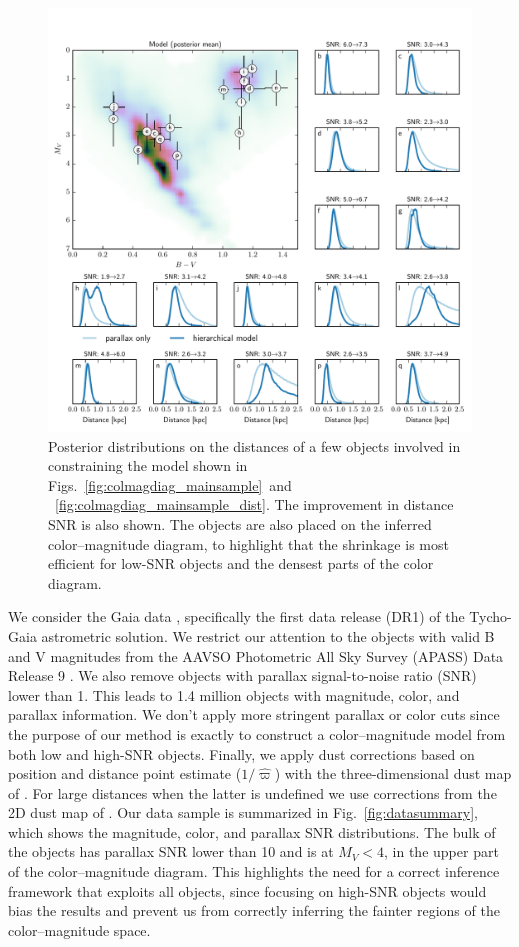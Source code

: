 \documentclass[manuscript, letterpaper]{aastex6}
\newcommand{\figref}[1]{{\xspace}Fig.~\ref{#1}}
\newcommand{\figrefs}[2]{{\xspace}Figs.~\ref{#1}~and ~\ref{#2}}
\begin{document}
\begin{figure}
\hspace*{-2mm}\includegraphics[width=15.7cm]{model_dist_pdfs.pdf}
\caption{Posterior distributions on the distances of a few objects involved in constraining the model shown in \figrefs{fig:colmagdiag_mainsample}{fig:colmagdiag_mainsample_dist}. 
The improvement in distance SNR is also shown. The objects are also placed on the inferred color--magnitude diagram, to highlight that the shrinkage is most efficient for low-SNR objects and the densest parts of the color diagram.}
\end{figure}

We consider the Gaia data \citep{gaia}, specifically the first data release (DR1) of the Tycho-Gaia astrometric solution\citep[hereafter TGAS][]{gaia_dr1}.
We restrict our attention to the objects with valid B and V magnitudes from the AAVSO Photometric All Sky Survey (APASS) Data Release 9 \citep{munari2014, hendenmunari2014}. 
We also remove objects with parallax signal-to-noise ratio (SNR) lower than 1. 
This leads to 1.4 million objects with magnitude, color, and parallax information. 
We don't apply more stringent parallax or color cuts since the purpose of our method is exactly to construct a color--magnitude model from both low and high-SNR objects. 
Finally, we apply dust corrections based on position and distance point estimate ($1/\hat{\varpi}$) with the three-dimensional dust map of \cite{Green2015bayestar}. 
For large distances when the latter is undefined we use corrections from the 2D dust map of \cite{sfd1998}.
Our data sample is summarized in \figref{fig:datasummary}, which shows the magnitude, color, and parallax SNR distributions.
The bulk of the objects has parallax SNR lower than 10 and is at $M_V  < 4$, in the upper part of the color--magnitude diagram.
This highlights the need for a correct inference framework that exploits all objects, since focusing on high-SNR objects would bias the results and prevent us from correctly inferring the fainter regions of the color--magnitude space.
\end{document}
